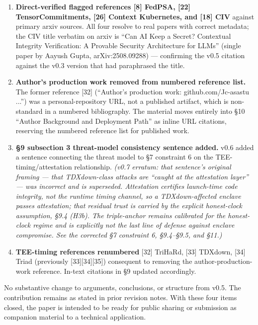 \documentclass[11pt]{article}
\begin{document}
\begin{enumerate}
\item \textbf{Direct-verified flagged references [8] FedPSA, [22] TensorCommitments, [26] Context Kubernetes, and [18] CIV} against primary arxiv sources. All four resolve to real papers with correct metadata; the CIV title verbatim on arxiv is ``Can AI Keep a Secret? Contextual Integrity Verification: A Provable Security Architecture for LLMs'' (single paper by Aayush Gupta, arXiv:2508.09288) --- confirming the v0.5 citation against the v0.3 version that had paraphrased the title.

\item \textbf{Author's production work removed from numbered reference list.} The former reference [32] (``Author's production work: github.com/Jc-asastu ...'') was a personal-repository URL, not a published artifact, which is non-standard in a numbered bibliography. The material moves entirely into \S10 ``Author Background and Deployment Path'' as inline URL citations, reserving the numbered reference list for published work.

\item \textbf{\S9 subsection 3 threat-model consistency sentence added.} v0.6 added a sentence connecting the threat model to \S7 constraint 6 on the TEE-timing/attestation relationship. \emph{(v0.7 erratum: that sentence's original framing --- that TDXdown-class attacks are ``caught at the attestation layer'' --- was incorrect and is superseded. Attestation certifies launch-time code integrity, not the runtime timing channel, so a TDXdown-affected enclave passes attestation; that residual trust is carried by the explicit honest-clock assumption, \S9.4 (H3b). The triple-anchor remains calibrated for the honest-clock regime and is explicitly not the last line of defense against enclave compromise. See the corrected \S7 constraint 6, \S9.4--\S9.5, and \S11.)}

\item \textbf{TEE-timing references renumbered} [32] TriHaRd, [33] TDXdown, [34] Triad (previously [33][34][35]) consequent to removing the author-production-work reference. In-text citations in \S9 updated accordingly.
\end{enumerate}

No substantive change to arguments, conclusions, or structure from v0.5. The contribution remains as stated in prior revision notes. With these four items closed, the paper is intended to be ready for public sharing or submission as companion material to a technical application.
\end{document}
